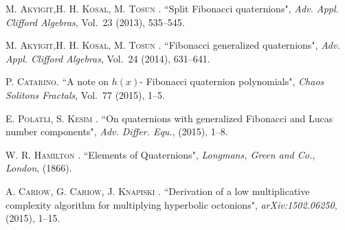 \begin{thebibliography}{00}
\textsc{M. Akyigit,H. H. Kosal, M. Tosun }. {``Split Fibonacci quaternions"}, \emph{Adv. Appl. Clifford Algebras}, Vol.~{23} (2013), 535--545.%

\textsc{M. Akyigit,H. H. Kosal, M. Tosun }. {``Fibonacci generalized quaternions"}, \emph{Adv. Appl. Clifford Algebras}, Vol.~{24} (2014), 631--641.%

\textsc{P. Catarino}. {``A note on $h(x)$- Fibonacci quaternion polynomials"}, \emph{ Chaos Solitons Fractals}, Vol.~{77} (2015), 1--5.%

\textsc{E. Polatli, S. Kesim }. {``On quaternions with generalized Fibonacci and Lucas number components"}, \emph{Adv. Differ. Equ.}, (2015), 1--8.%

\textsc{ W. R. Hamilton }. {``Elements of Quaternions"}, \emph{Longmans, Green and Co., London}, (1866).%

\textsc{ A. Cariow, G. Cariow, J. Knapiski }. {``Derivation of a low multiplicative complexity algorithm for multiplying hyperbolic octonions"}, \emph{arXiv:1502.06250}, (2015), 1--15.%



\end{thebibliography}

